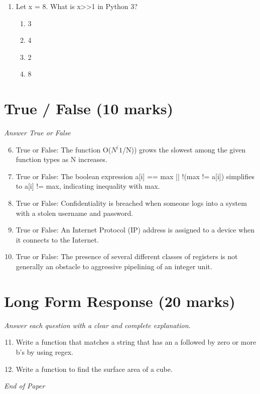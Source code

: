 \documentclass[12pt]{article}
\begin{document}
\begin{enumerate}[label=\arabic*.]
\begin{enumerate}[label=(\alph*)]
    \item xyz
    \item xy
    \item xxzy
    \item xxxxy
\end{enumerate}
\item Let x = 8. What is x\textgreater{}\textgreater{}1 in Python 3?
\begin{enumerate}[label=(\alph*)]
    \item 3
    \item 4
    \item 2
    \item 8
\end{enumerate}
\end{enumerate}

\section*{True / False (10 marks)}
\textit{Answer True or False}
\begin{enumerate}[label=\arabic*.]
\setcounter{enumi}{5}
\item True or False: The function O($N^(1$/N)) grows the slowest among the given function types as N increases.
\item True or False: The boolean expression a[i] == max || !(max != a[i]) simplifies to a[i] != max, indicating inequality with max.
\item True or False: Confidentiality is breached when someone logs into a system with a stolen username and password.
\item True or False: An Internet Protocol (IP) address is assigned to a device when it connects to the Internet.
\item True or False: The presence of several different classes of registers is not generally an obstacle to aggressive pipelining of an integer unit.
\end{enumerate}

\section*{Long Form Response (20 marks)}
\textit{Answer each question with a clear and complete explanation.}
\begin{enumerate}[label=\arabic*.]
\setcounter{enumi}{10}
\item Write a function that matches a string that has an a followed by zero or more b's by using regex.
\item Write a function to find the surface area of a cube.
\end{enumerate}

\vfill
\noindent\textit{End of Paper}
\end{document}

